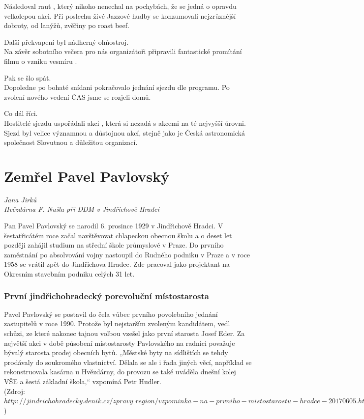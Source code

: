 \documentclass[10pt,a5paper,twoside]{book}
\newcommand{\nadpis}[2]{
\section*{#1}
	\begin{flushright}
	\textit{#2}
	\end{flushright}
}
\begin{document}
Následoval raut , který nikoho nenechal na pochybách, že se jedná o opravdu velkolepou akci. Při poslechu živé Jazzové hudby se konzumovali nejzrůznější dobroty, od lanýžů, zvěřiny  po roast beef. 


Další překvapení byl nádherný ohňostroj. \\ 
Na závěr sobotního večera pro nás organizátoři připravili fantastické promítání filmu o vzniku vesmíru .


Pak se šlo spát.\\
Dopoledne po bohaté snídani pokračovalo jednání sjezdu dle programu. Po zvolení nového vedení ČAS jsme se rozjeli domů.


Co dál říci.\\
Hostitelé sjezdu uspořádali akci , která si nezadá s akcemi na té nejvyšší úrovni. Sjezd byl velice významnou a důstojnou akcí, stejně jako je Česká astronomická společnost Slovutnou a důležitou organizací.





\nadpis{Zemřel Pavel Pavlovský}{Jana Jirků \\ Hvězdárna F. Nušla při DDM v Jindřichově Hradci}

Pan Pavel Pavlovský se narodil 6. prosince 1929 v Jindřichově Hradci. V šestatřicátém roce začal navštěvovat chlapeckou obecnou školu a o deset let později zahájil studium na střední škole průmyslové v Praze. Do prvního zaměstnání po absolvování vojny nastoupil do Rudného podniku v Praze a v roce 1958 se vrátil zpět do Jindřichova Hradce. Zde pracoval jako projektant na Okresním stavebním podniku celých 31 let.


\subsubsection*{První jindřichohradecký porevoluční místostarosta}
Pavel Pavlovský se postavil do čela vůbec prvního povolebního jednání zastupitelů v roce 1990. Protože byl nejstarším zvoleným kandidátem, vedl schůzi, ze které nakonec tajnou volbou vzešel jako první starosta Josef Eder. Za největší akci v době působení místostarosty Pavlovského na radnici považuje bývalý starosta prodej obecních bytů. „Městské byty na sídlištích se tehdy prodávaly do soukromého vlastnictví. Dělala se ale i řada jiných věcí, například se rekonstruovala kasárna u Hvězdárny, do provozu se také uváděla dnešní kolej VŠE a šestá základní škola,“ vzpomíná Petr Hudler.\\
(Zdroj: $http://jindrichohradecky.denik.cz/zpravy\_region/vzpominka-na- prvniho-mistostarostu-hradce-20170605.html$)
\end{document}
